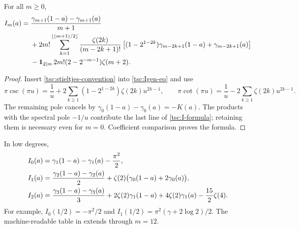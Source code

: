 \begin{corollary}\label{tsc:Iexplicit}
For all $m\ge0$,
\begin{align}\label{tsc:I-formula}
 I_m(a)={}&\frac{\gamma_{m+1}(1-a)-\gamma_{m+1}(a)}{m+1}\notag\\
 &+2m!\sum_{k=1}^{\lfloor(m+1)/2\rfloor}
       \frac{\zeta(2k)}{(m-2k+1)!}
       \left[(1-2^{1-2k})\gamma_{m-2k+1}(1-a)
                       +\gamma_{m-2k+1}(a)\right]\notag\\
 &-\mathbf1_{2\mid m}\,2m!(2-2^{-m-1})\zeta(m+2).
\end{align}
\end{corollary}
\begin{proof}
Insert \eqref{tsc:stieltjes-convention} into \eqref{tsc:Igen-eq} and use
\[
 \pi\csc(\pi u)=\frac1u+
     2\sum_{k\ge1}(1-2^{1-2k})\zeta(2k)u^{2k-1},\qquad
 \pi\cot(\pi u)=\frac1u-2\sum_{k\ge1}\zeta(2k)u^{2k-1}.
\]
The remaining pole cancels by
$\gamma_0(1-a)-\gamma_0(a)=-K(a)$. The products with the spectral pole
$-1/u$ contribute the last line of \eqref{tsc:I-formula}; retaining them
is necessary even for $m=0$. Coefficient comparison proves the formula.
\end{proof}
In low degrees,
\begin{align}\label{tsc:Iexamples}
 I_0(a)&=\gamma_1(1-a)-\gamma_1(a)-\frac{\pi^2}{2},\notag\\
 I_1(a)&=\frac{\gamma_2(1-a)-\gamma_2(a)}2
           +\zeta(2)\bigl(\gamma_0(1-a)+2\gamma_0(a)\bigr),\notag\\
 I_2(a)&=\frac{\gamma_3(1-a)-\gamma_3(a)}3
       +2\zeta(2)\gamma_1(1-a)+4\zeta(2)\gamma_1(a)
       -\frac{15}{2}\zeta(4).
\end{align}
For example, $I_0(1/2)=-\pi^2/2$ and
$I_1(1/2)=\pi^2(\gamma+2\log2)/2$. The machine-readable table in
 extends through $m=12$.

